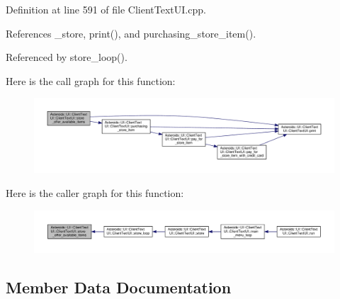 Definition at line 591 of file Client\+Text\+U\+I.\+cpp.



References \+\_\+store, print(), and purchasing\+\_\+store\+\_\+item().



Referenced by store\+\_\+loop().

Here is the call graph for this function\+:
\nopagebreak
\begin{figure}[H]
\begin{center}
\leavevmode
\includegraphics[width=350pt]{classAsteroids_1_1UI_1_1ClientTextUI_1_1ClientTextUI_a9175792a129c214f55dd0bda9ac36b33_cgraph}
\end{center}
\end{figure}
Here is the caller graph for this function\+:
\nopagebreak
\begin{figure}[H]
\begin{center}
\leavevmode
\includegraphics[width=350pt]{classAsteroids_1_1UI_1_1ClientTextUI_1_1ClientTextUI_a9175792a129c214f55dd0bda9ac36b33_icgraph}
\end{center}
\end{figure}


\subsection{Member Data Documentation}
\mbox{\label{classAsteroids_1_1UI_1_1ClientTextUI_1_1ClientTextUI_ae52171fdbc596c6a59c81635794991e8}} 
